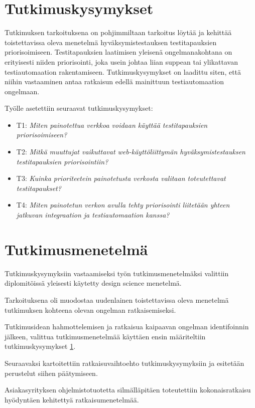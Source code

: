 \section{Tutkimuskysymykset} \label{06_tutkimuskysymykset}

Tutkimuksen tarkoituksena on pohjimmiltaan tarkoitus löytää ja kehittää toistettavissa oleva menetelmä hyväksymistestauksen testitapauksien priorisoimiseen.
Testitapauksien laatimisen yleisenä ongelmanakohtana on erityisesti niiden priorisointi, joka usein johtaa liian suppean tai ylikattavan testiautomaation rakentamiseen.
Tutkimuskysymykset on laadittu siten, että niihin vastaaminen antaa ratkaisun edellä mainittuun testiautomaation ongelmaan.

Työlle asetettiin seuraavat tutkimuskysymykset:
\begin{itemize}
  \item T1: \emph{Miten painotettua verkkoa voidaan käyttää testitapauksien priorisoimiseen?}
  \item T2: \emph{Mitkä muuttujat vaikuttavat web-käyttöliittymän hyväksymistestauksen testitapauksien priorisointiin?}
  \item T3: \emph{Kuinka prioriteetein painotetusta verkosta valitaan toteutettavat testitapaukset?}
  \item T4: \emph{Miten painotetun verkon avulla tehty priorisointi liitetään yhteen jatkuvan integraation ja testiautomaation kanssa?}
\end{itemize}

\section{Tutkimusmenetelmä} \label{06_tutkimusmenetelma}

Tutkimuskysymyksiin vastaamiseksi työn tutkimusmenetelmäksi valittiin diplomitöissä yleisesti käytetty design science menetelmä.

Tarkoituksena oli muodostaa uudenlainen toistettavissa oleva menetelmä tutkimuksen kohteena olevan ongelman ratkaisemiseksi.

Tutkimusidean hahmottelemisen ja ratkaisua kaipaavan ongelman identifoinnin jälkeen, valittua tutkimusmenetelmää käyttäen ensin määriteltiin tutkimuskysymykset \ref{06_tutkimuskysymykset}.

Seuraavaksi kartoitettiin ratkaisuvaihtoehto tutkimuskysymyksiin ja esitetään perustelut siihen päätymiseen.

Asiakasyrityksen ohjelmistotuotetta silmälläpitäen toteutettiin kokonaisratkaisu hyödyntäen kehitettyä ratkaisumenetelmää.

